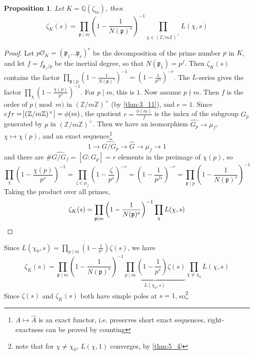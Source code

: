 \documentclass[11pt]{article}
\theoremstyle{definition}
\theoremstyle{plain}
\newtheorem{proposition}[definition]{Proposition}
\theoremstyle{remark}
\newcommand{\ZZ}{\mathbb{Z}}
\newcommand{\QQ}{\mathbb{Q}}
\newcommand{\cO}{\mathcal{O}}
\newcommand{\fp}{\mathfrak{p}}
\begin{document}
\begin{proposition}\label{prop:7_17}
    Let $K = \QQ(\zeta_m)$, then
    \begin{equation*}
        \zeta_K(s) = \prod_{\fp \mid m} \left(1 - \frac{1}{N(\fp)^s}\right)^{-1} \prod_{\chi \in \widehat{(\ZZ / m \ZZ)^\times}} L(\chi, s)
    \end{equation*}
\end{proposition}
\begin{proof}
    Let $p \cO_K = (\fp_1 \ldots \fp_r)^e$ be the decomposition of the prime number $p$ in $K$, and let $f = f_{\fp_1/p}$ be the inertial degree, so that $N(\fp_1) = p^f$. Then $\zeta_K(s)$ contains the factor $\prod_{\fp \mid p} \left(1 - \frac{1}{N(\fp)^s}\right)^{-1} = \left(1 - \frac{1}{p^{fs}}\right)^{-r}$. The $L$-series gives the factor $\prod_{\chi} \left(1 - \frac{\chi(p)}{p^s}\right)^{-1}$. For $p \mid m$, this is $1$. Now assume $p \nmid m$. Then $f$ is the order of $p \pmod{m}$ in $(\ZZ/m\ZZ)^\times$ (by \autoref{thm:3_11}), and $e = 1$. %
    Since $efr = \abs{(\ZZ / m \ZZ)^\times} = \phi(m)$, the quotient $r = \frac{\phi(m)}{f}$ is the index of the subgroup $G_p$ generated by $p$ in $(\ZZ / m \ZZ)^\times$. Then we have an isomorphism $\widehat{G_p} \to \mu_f$, $\chi \mapsto \chi(p)$, and an exact sequence\footnote{$A \mapsto \widehat{A}$ is an exact functor, i.e. preserves short exact sequences, right-exactness can be proved by counting}
    \begin{equation*}
        1 \longrightarrow \widehat{G/G_p} \longrightarrow \widehat{G} \longrightarrow \mu_f \longrightarrow 1
    \end{equation*}
    and there are $\# \widehat{G / G_f} = [G : G_p] = r$ elements in the preimage of $\chi(p)$, so
    \begin{equation*}
        \prod_{\chi} \left(1-\frac{\chi(p)}{p^s}\right)^{-1} = \prod_{\zeta \in \mu_f} \left(1 - \frac{\zeta}{p^s}\right)^{-r} = \left(1-\frac{1}{p^{fs}}\right)^{-r} = \prod_{\fp \mid p} \left(1-\frac{1}{N(\fp)^s}\right)^{-1}
    \end{equation*}
    Taking the product over all primes,
    \begin{equation*}
        \zeta_K(s) = \prod_{\fp \mid m} \left(1 - \frac{1}{N(\fp)^s}\right)^{-1} \prod_{\chi} L(\chi, s) \qedhere
    \end{equation*}
\end{proof}

\noindent Since $L(\chi_0, s) = \prod_{p \mid m} (1 - \frac{1}{p^s}) \zeta(s)$, we have
\begin{equation*}
    \zeta_K(s) = \prod_{\fp \mid m} \left(1 - \frac{1}{N(\fp)^s}\right)^{-1} \underbrace{\prod_{p \mid m} \left(1 - \frac{1}{p^s}\right) \zeta(s)}_{L(\chi_0, s)} \prod_{\chi \neq \chi_0} L(\chi, s)
\end{equation*}
Since $\zeta(s)$ and $\zeta_K(s)$ both have simple poles at $s = 1$, so\footnote{note that for $\chi \neq \chi_0$, $L(\chi, 1)$ converges, by \autoref{thm:5_4}}
\end{document}
